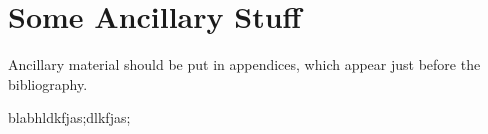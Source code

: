 \chapter{Some Ancillary Stuff}

Ancillary material should be put in appendices, which 
appear just before the bibliography. \nocite{*}


blabhldkfjas;dlkfjas;
